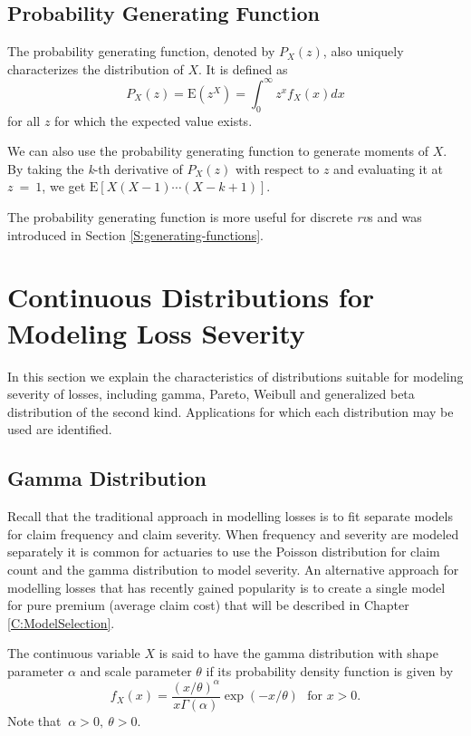 \documentclass[]{book}
\theoremstyle{definition}
\theoremstyle{definition}
\theoremstyle{definition}
\theoremstyle{remark}
\begin{document}
\subsection{Probability Generating
Function}\label{probability-generating-function}

The probability generating function, denoted by
\(P_{X}\left( z \right)\), also uniquely characterizes the distribution
of \(X\). It is defined as
\[P_{X}\left( z \right) = \mathrm{E}\left( z^{X} \right) = \int_{0}^{\infty}{z^{x}f_{X}\left( x \right) dx}\]
for all \(z\) for which the expected value exists.

We can also use the probability generating function to generate moments
of \(X\). By taking the \emph{k}-th derivative of
\(P_{X}\left( z \right)\) with respect to \(z\) and evaluating it at
\(z\  = \ 1\), we get
\(\mathrm{E}\left\lbrack X\left( X - 1 \right)\cdots\left( X - k + 1 \right) \right\rbrack .\)

The probability generating function is more useful for discrete
\emph{rv}s and was introduced in Section \ref{S:generating-functions}.

\section{Continuous Distributions for Modeling Loss
Severity}\label{S:ContinuousDistn}

In this section we explain the characteristics of distributions suitable
for modeling severity of losses, including gamma, Pareto, Weibull and
generalized beta distribution of the second kind. Applications for which
each distribution may be used are identified.

\subsection{Gamma Distribution}\label{gamma-distribution}

Recall that the traditional approach in modelling losses is to fit
separate models for claim frequency and claim severity. When frequency
and severity are modeled separately it is common for actuaries to use
the Poisson distribution for claim count and the gamma distribution to
model severity. An alternative approach for modelling losses that has
recently gained popularity is to create a single model for pure premium
(average claim cost) that will be described in Chapter
\ref{C:ModelSelection}.

The continuous variable \(X\) is said to have the gamma distribution
with shape parameter \(\alpha\) and scale parameter \(\theta\) if its
probability density function is given by
\[f_{X}\left( x \right) = \frac{\left( x/ \theta  \right)^{\alpha}}{x\Gamma\left( \alpha \right)}\exp \left( -x/ \theta \right) \ \ \ \text{for } x > 0 .\]
Note that \(\ \alpha > 0,\ \theta > 0\).
\end{document}
